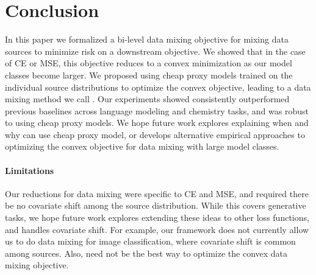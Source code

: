 \section{Conclusion}

In this paper we formalized a bi-level data mixing objective for mixing data sources to minimize risk on a downstream objective. We showed that in the case of CE or MSE, this objective reduces to a convex minimization as our model classes become larger. We proposed using cheap proxy models trained on the individual source distributions to optimize the convex objective, leading to a data mixing method we call \methodnospace. Our experiments showed \method consistently outperformed previous baselines across language modeling and chemistry tasks, and was robust to using cheap proxy models. We hope future work explores explaining when and why \method can use cheap proxy model, or develops alternative empirical approaches to optimizing the convex objective for data mixing with large model classes.

\paragraph{Limitations} Our reductions for data mixing were specific to CE and MSE, and required there be no covariate shift among the source distribution. While this covers generative tasks, we hope future work explores extending these ideas to other loss functions, and handles covariate shift. For example, our framework does not currently allow us to do data mixing for image classification, where covariate shift is common among sources. Also, \method need not be the best way to optimize the convex data mixing objective.
